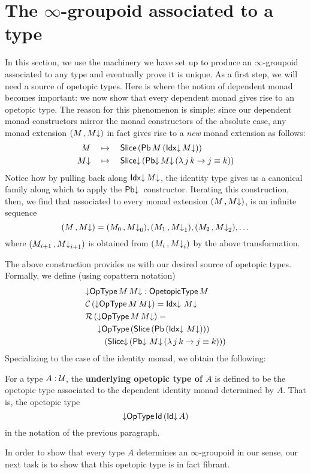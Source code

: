 \section{The $\infty$-groupoid associated to a type}
\label{sec:infty-group-assoc}

In this section, we use the machinery we have set up to produce an
$\infty$-groupoid associated to any type and eventually prove it is
unique.  As a first step, we will need a source of opetopic types.
Here is where the notion of dependent monad becomes important: we now
show that every dependent monad gives rise to an opetopic type.  The
reason for this phenomenon is simple: since our dependent monad
constructors mirror the monad constructors of the absolute case, any
monad extension $(M \,, M{\downarrow})$ in fact gives rise to a \emph{new}
monad extension as follows:
\begin{align*}
  M &\quad \mapsto \quad \mathsf{Slice}\, (\mathsf{Pb}\, M\, (\mathsf{Idx}{\downarrow}\, M{\downarrow})) \\
  M{\downarrow} &\quad \mapsto \quad \mathsf{Slice{\downarrow}}\, (\mathsf{Pb{\downarrow}}\, M{\downarrow}\, (\lambda\, j\, k \to j \equiv k))
\end{align*}
Notice how by pulling back along $\mathsf{Idx}{\downarrow}\, M{\downarrow}$, the identity type gives
us a canonical family along which to apply the $\mathsf{Pb{\downarrow}}\,$ constructor.
Iterating this construction, then, we find that associated to every
monad extension $(M \,, M{\downarrow})$, is an infinite sequence
\[ (M \,, M{\downarrow}) = (M_0 \,, M{\downarrow}_0), (M_1 \,, M{\downarrow}_1), (M_2 \,, M{\downarrow}_2),
  \dots \] where $(M_{i+1} \,, M{\downarrow}_{i+1})$ is obtained from
$(M_i \,, M{\downarrow}_i)$ by the above transformation.

The above construction provides us with our desired source of opetopic
types.  Formally, we define (using copattern notation)
\begin{align*}
  &{\downarrow}\mathsf{OpType}\, M\, M{\downarrow} : \mathsf{OpetopicType}\, M  \\
  &\mathcal{C}\, ({\downarrow}\mathsf{OpType}\, M\, M{\downarrow}) = \mathsf{Idx}{\downarrow}\,\, M{\downarrow} \\
  &\mathcal{R}\, ({\downarrow}\mathsf{OpType}\, M\, M{\downarrow}) = \\
  &\hspace{.5cm}{\downarrow}\mathsf{OpType}\, (\mathsf{Slice}\, (\mathsf{Pb}\, (\mathsf{Idx}{\downarrow}\,\, M{\downarrow}))) \\
  &\hspace{.8cm} (\mathsf{Slice{\downarrow}}\, (\mathsf{Pb{\downarrow}}\,\, M{\downarrow}\, (\lambda\, j\, k \to j \equiv k)))
\end{align*}
Specializing to the case of the identity monad, we obtain the
following:

\begin{defn}
  For a type $A : \mathcal{U}$, the \textbf{underlying opetopic type
    of $A$} is defined to be the opetopic type associated
  to the dependent identity monad determined by $A$.  That is,
  the opetopic type
  \[ {\downarrow}\mathsf{OpType}\, \mathsf{Id}\, (\mathsf{Id}{\downarrow}\, A) \]
  in the notation of the previous paragraph.
\end{defn}
In order to show that every type $A$ determines an $\infty$-groupoid
in our sense, our next task is to show that this opetopic type is
in fact fibrant.


